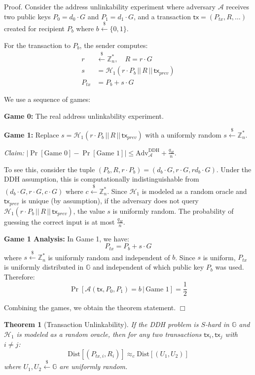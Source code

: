 \documentclass{article}
\newtheorem{theorem}{Theorem}[section]
\newenvironment{proof}{\textsf{Proof}.}{\hfill$\Box$}
\begin{document}
\begin{proof}
Consider the address unlinkability experiment where adversary $\mathcal{A}$ receives two public keys $P_0 = d_0 \cdot G$ and $P_1 = d_1 \cdot G$, and a transaction $\mathsf{tx} = (P_{tx}, R, \ldots)$ created for recipient $P_b$ where $b \stackrel{\$}{\leftarrow} \{0,1\}$.

For the transaction to $P_b$, the sender computes:
\begin{align*}
r &\stackrel{\$}{\leftarrow} \mathbb{Z}_n^*, \quad R = r \cdot G \\
s &= \mathcal{H}_1(r \cdot P_b \,||\, R \,||\, \mathsf{tx}_{prev}) \\
P_{tx} &= P_b + s \cdot G
\end{align*}

We use a sequence of games:

\textbf{Game 0:} The real address unlinkability experiment.

\textbf{Game 1:} Replace $s = \mathcal{H}_1(r \cdot P_b \,||\, R \,||\, \mathsf{tx}_{prev})$ with a uniformly random $s \stackrel{\$}{\leftarrow} \mathbb{Z}_n^*$.

\noindent\textit{Claim:} $|\Pr[\text{Game 0}] - \Pr[\text{Game 1}]| \leq \text{Adv}^{\text{DDH}}_{\mathcal{A}} + \frac{q_H}{n}$.

To see this, consider the tuple $(P_b, R, r \cdot P_b) = (d_b \cdot G, r \cdot G, rd_b \cdot G)$. Under the DDH assumption, this is computationally indistinguishable from $(d_b \cdot G, r \cdot G, c \cdot G)$ where $c \stackrel{\$}{\leftarrow} \mathbb{Z}_n^*$. Since $\mathcal{H}_1$ is modeled as a random oracle and $\mathsf{tx}_{prev}$ is unique (by assumption), if the adversary does not query $\mathcal{H}_1(r \cdot P_b \,||\, R \,||\, \mathsf{tx}_{prev})$, the value $s$ is uniformly random. The probability of guessing the correct input is at most $\frac{q_H}{n}$.

\textbf{Game 1 Analysis:} In Game 1, we have:
$$P_{tx} = P_b + s \cdot G$$
where $s \stackrel{\$}{\leftarrow} \mathbb{Z}_n^*$ is uniformly random and independent of $b$. Since $s$ is uniform, $P_{tx}$ is uniformly distributed in $\mathbb{G}$ and independent of which public key $P_b$ was used. Therefore:
$$\Pr[\mathcal{A}(\mathsf{tx}, P_0, P_1) = b \,|\, \text{Game 1}] = \frac{1}{2}$$

Combining the games, we obtain the theorem statement.
\end{proof}

\begin{theorem}[Transaction Unlinkability]
\label{thm:transaction-unlinkability}
If the DDH problem is $S$-hard in $\mathbb{G}$ and $\mathcal{H}_1$ is modeled as a random oracle, then for any two transactions $\mathsf{tx}_i, \mathsf{tx}_j$ with $i \neq j$:
$$\text{Dist}[(P_{tx,i}, R_i)] \approx_c \text{Dist}[(U_1, U_2)]$$
where $U_1, U_2 \stackrel{\$}{\leftarrow} \mathbb{G}$ are uniformly random.
\end{theorem}
\end{document}
